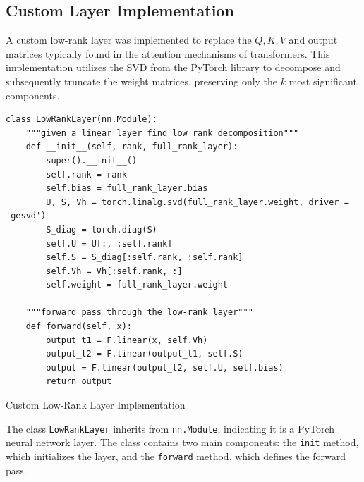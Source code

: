    \subsection{Custom Layer Implementation}
        A custom low-rank layer was implemented to replace the \(Q, K, V\) and output matrices typically found in the attention mechanisms of transformers. This implementation utilizes the SVD from the PyTorch library to decompose and subsequently truncate the weight matrices, preserving only the \(k\) most significant components.
        \begin{listing}[H]
\begin{verbatim}
class LowRankLayer(nn.Module):
    """given a linear layer find low rank decomposition"""
    def __init__(self, rank, full_rank_layer):
        super().__init__()
        self.rank = rank
        self.bias = full_rank_layer.bias
        U, S, Vh = torch.linalg.svd(full_rank_layer.weight, driver = 'gesvd')
        S_diag = torch.diag(S)
        self.U = U[:, :self.rank]
        self.S = S_diag[:self.rank, :self.rank]
        self.Vh = Vh[:self.rank, :]
        self.weight = full_rank_layer.weight

    """forward pass through the low-rank layer"""
    def forward(self, x):
        output_t1 = F.linear(x, self.Vh)
        output_t2 = F.linear(output_t1, self.S)
        output = F.linear(output_t2, self.U, self.bias)
        return output
\end{verbatim}
            \caption{Custom Low-Rank Layer Implementation}
            \label{listing:LowRankLayer_Implementation}
            \end{listing}
            
            The class \texttt{LowRankLayer} inherits from \texttt{nn.Module}, indicating it is a PyTorch neural network layer. The class contains two main components: the \texttt{init} method, which initializes the layer, and the \texttt{forward} method, which defines the forward pass.

